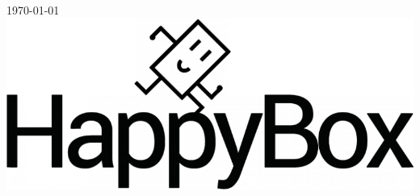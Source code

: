 \documentclass[11pt, a4paper ]{article}
\begin{document}
\begin{titlepage}

{\large \today}\\[2cm] %


\includegraphics[width=\textwidth]{images/happybox-logo-transparent.png}\\[1cm] %


\vfill %

\end{titlepage}

	\tableofcontents
\end{document}
